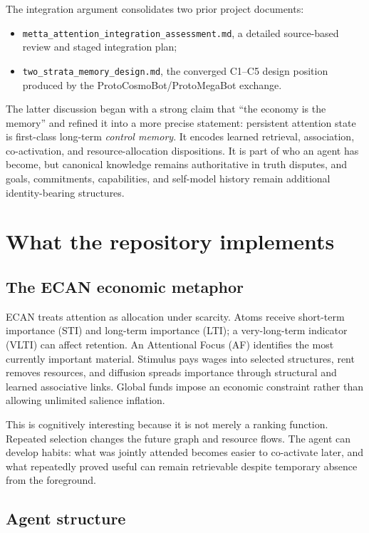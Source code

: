 \documentclass[11pt]{article}
\newcommand{\code}[1]{\texttt{#1}}
\begin{document}
The integration argument consolidates two prior project documents:
\begin{itemize}
  \item \code{metta\_attention\_integration\_assessment.md}, a detailed
  source-based review and staged integration plan;
  \item \code{two\_strata\_memory\_design.md}, the converged C1--C5 design
  position produced by the ProtoCosmoBot/ProtoMegaBot exchange.
\end{itemize}

The latter discussion began with a strong claim that ``the economy is the
memory'' and refined it into a more precise statement: persistent attention
state is first-class long-term \emph{control memory}.  It encodes learned
retrieval, association, co-activation, and resource-allocation dispositions.
It is part of who an agent has become, but canonical knowledge remains
authoritative in truth disputes, and goals, commitments, capabilities, and
self-model history remain additional identity-bearing structures.

\section{What the repository implements}

\subsection{The ECAN economic metaphor}

ECAN treats attention as allocation under scarcity.  Atoms receive short-term
importance (STI) and long-term importance (LTI); a very-long-term indicator
(VLTI) can affect retention.  An Attentional Focus (AF) identifies the most
currently important material.  Stimulus pays wages into selected structures,
rent removes resources, and diffusion spreads importance through structural and
learned associative links.  Global funds impose an economic constraint rather
than allowing unlimited salience inflation.

This is cognitively interesting because it is not merely a ranking function.
Repeated selection changes the future graph and resource flows.  The agent can
develop habits: what was jointly attended becomes easier to co-activate later,
and what repeatedly proved useful can remain retrievable despite temporary
absence from the foreground.

\subsection{Agent structure}
\end{document}
